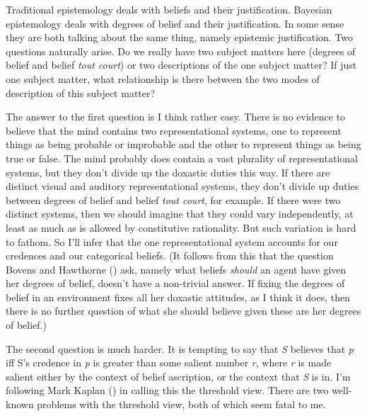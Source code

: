 \documentclass[
  10pt,
  letterpaper,
  DIV=11,
  numbers=noendperiod,
  twoside]{scrartcl}
\begin{document}
Traditional epistemology deals with beliefs and their justification.
Bayesian epistemology deals with degrees of belief and their
justification. In some sense they are both talking about the same thing,
namely epistemic justification. Two questions naturally arise. Do we
really have two subject matters here (degrees of belief and belief
\emph{tout court}) or two descriptions of the one subject matter? If
just one subject matter, what relationship is there between the two
modes of description of this subject matter?

The answer to the first question is I think rather easy. There is no
evidence to believe that the mind contains two representational systems,
one to represent things as being probable or improbable and the other to
represent things as being true or false. The mind probably does contain
a vast plurality of representational systems, but they don't divide up
the doxastic duties this way. If there are distinct visual and auditory
representational systems, they don't divide up duties between degrees of
belief and belief \emph{tout court}, for example. If there were two
distinct systems, then we should imagine that they could vary
independently, at least as much as is allowed by constitutive
rationality. But such variation is hard to fathom. So I'll infer that
the one representational system accounts for our credences and our
categorical beliefs. (It follows from this that the question Bovens and
Hawthorne () ask, namely what beliefs
\emph{should} an agent have given her degrees of belief, doesn't have a
non-trivial answer. If fixing the degrees of belief in an environment
fixes all her doxastic attitudes, as I think it does, then there is no
further question of what she should believe given these are her degrees
of belief.)

The second question is much harder. It is tempting to say that \emph{S}
believes that \emph{p} iff S's credence in \emph{p} is greater than some
salient number \emph{r}, where \emph{r} is made salient either by the
context of belief ascription, or the context that \emph{S} is in. I'm
following Mark Kaplan () in calling this
the threshold view. There are two well-known problems with the threshold
view, both of which seem fatal to me.
\end{document}
